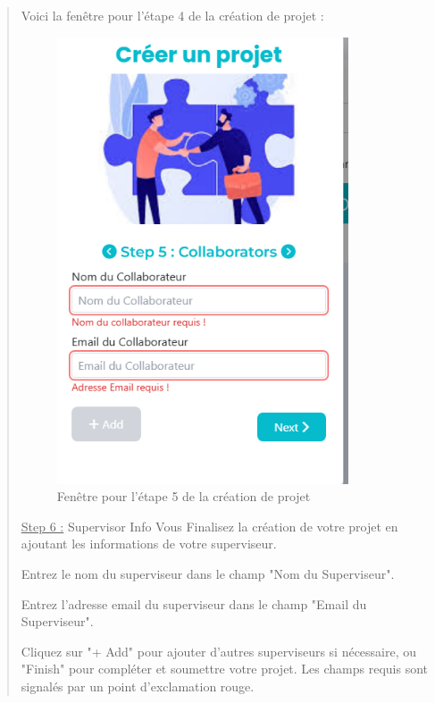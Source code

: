 \documentclass[a4paper,12pt]{article}
\begin{document}
\begin{quote}
Voici la fenêtre pour l'étape 4 de la création de projet :

\begin{figure}[H]
\centering
\includegraphics[width=0.85\textwidth]{IMAGES/etape5-projet.png}
\caption{Fenêtre pour l'étape 5 de la création de projet}
\label{fig:etape5projet}
\end{figure}

\underline{Step 6 :} Supervisor Info Vous Finalisez la création de votre projet en ajoutant les informations de votre superviseur.

Entrez le nom du superviseur dans le champ "Nom du Superviseur".

Entrez l'adresse email du superviseur dans le champ "Email du Superviseur".

Cliquez sur "+ Add" pour ajouter d'autres superviseurs si nécessaire, ou "Finish" pour compléter et soumettre votre projet. Les champs requis sont signalés par un point d'exclamation rouge.


\end{quote}
\end{document}
